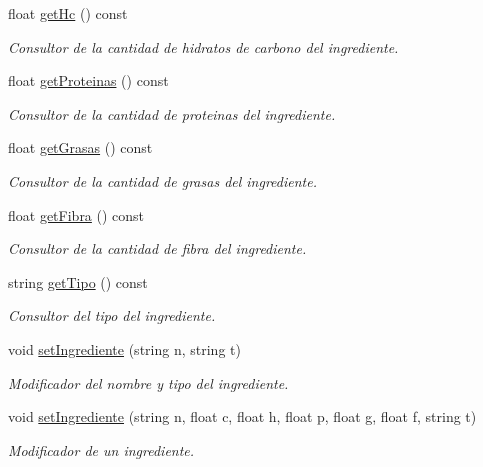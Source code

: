 \begin{DoxyCompactItemize}
float \hyperlink{classingrediente_a25b3b1bb017318d0aa9274484be7bc7a}{get\+Hc} () const
\begin{DoxyCompactList}\small\item\em Consultor de la cantidad de hidratos de carbono del ingrediente. \end{DoxyCompactList}\item 
float \hyperlink{classingrediente_a64258034d6cf7c70cb496dc91c7ab0fa}{get\+Proteinas} () const
\begin{DoxyCompactList}\small\item\em Consultor de la cantidad de proteinas del ingrediente. \end{DoxyCompactList}\item 
float \hyperlink{classingrediente_a6250c0751a2e5bc5adeb0c9de7f209e7}{get\+Grasas} () const
\begin{DoxyCompactList}\small\item\em Consultor de la cantidad de grasas del ingrediente. \end{DoxyCompactList}\item 
float \hyperlink{classingrediente_ad33a9651f19a39c8157dbd7d63c69cdb}{get\+Fibra} () const
\begin{DoxyCompactList}\small\item\em Consultor de la cantidad de fibra del ingrediente. \end{DoxyCompactList}\item 
string \hyperlink{classingrediente_a03334e887add1dbdc7991de77234ede7}{get\+Tipo} () const
\begin{DoxyCompactList}\small\item\em Consultor del tipo del ingrediente. \end{DoxyCompactList}\item 
void \hyperlink{classingrediente_a72f5ea23629bc29f3b45b7631550319b}{set\+Ingrediente} (string n, string t)
\begin{DoxyCompactList}\small\item\em Modificador del nombre y tipo del ingrediente. \end{DoxyCompactList}\item 
void \hyperlink{classingrediente_ad55708ee5921247d2060bd2fc54b5f15}{set\+Ingrediente} (string n, float c, float h, float p, float g, float f, string t)
\begin{DoxyCompactList}\small\item\em Modificador de un ingrediente. \end{DoxyCompactList}\item 

\end{DoxyCompactItemize}
